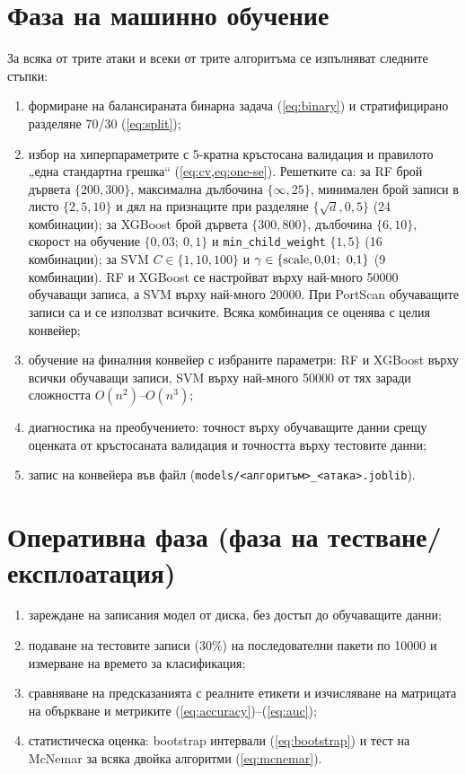 \section{Фаза на машинно обучение}
За всяка от трите атаки и всеки от трите алгоритъма се изпълняват следните стъпки:
\begin{enumerate}
  \item формиране на балансираната бинарна задача (\cref{eq:binary}) и стратифицирано разделяне 70/30 (\cref{eq:split});
  \item избор на хиперпараметрите с 5-кратна кръстосана валидация и правилото „една стандартна грешка“ (\cref{eq:cv,eq:one-se}). Решетките са: за RF брой дървета $\{200, 300\}$, максимална дълбочина $\{\infty, 25\}$, минимален брой записи в листо $\{2, 5, 10\}$ и дял на признаците при разделяне $\{\sqrt{d}, 0{,}5\}$ (24 комбинации); за XGBoost брой дървета $\{300, 800\}$, дълбочина $\{6, 10\}$, скорост на обучение $\{0{,}03;\ 0{,}1\}$ и \texttt{min\_child\_weight} $\{1, 5\}$ (16 комбинации); за SVM $C\in\{1, 10, 100\}$ и $\gamma\in\{\txt{scale}, 0{,}01;\ 0{,}1\}$ (9 комбинации). RF и XGBoost се настройват върху най-много \num{50000} обучаващи записа, а SVM върху най-много \num{20000}. При PortScan обучаващите записи са  и се използват всичките. Всяка комбинация се оценява с целия конвейер;
  \item обучение на финалния конвейер с избраните параметри: RF и XGBoost върху всички обучаващи записи, SVM върху най-много \num{50000} от тях заради сложността $O(n^2)$--$O(n^3)$;
  \item диагностика на преобучението: точност върху обучаващите данни срещу оценката от кръстосаната валидация и точността върху тестовите данни;
  \item запис на конвейера във файл (\texttt{models/<алгоритъм>\_<атака>.joblib}).
\end{enumerate}

\section{Оперативна фаза (фаза на тестване/експлоатация)}
\begin{enumerate}
  \item зареждане на записания модел от диска, без достъп до обучаващите данни;
  \item подаване на тестовите записи (30\%) на последователни пакети по \num{10000} и измерване на времето за класификация;
  \item сравняване на предсказанията с реалните етикети и изчисляване на матрицата на объркване и метриките (\ref{eq:accuracy})--(\ref{eq:auc});
  \item статистическа оценка: bootstrap интервали (\cref{eq:bootstrap}) и тест на McNemar за всяка двойка алгоритми (\cref{eq:mcnemar}).
\end{enumerate}

